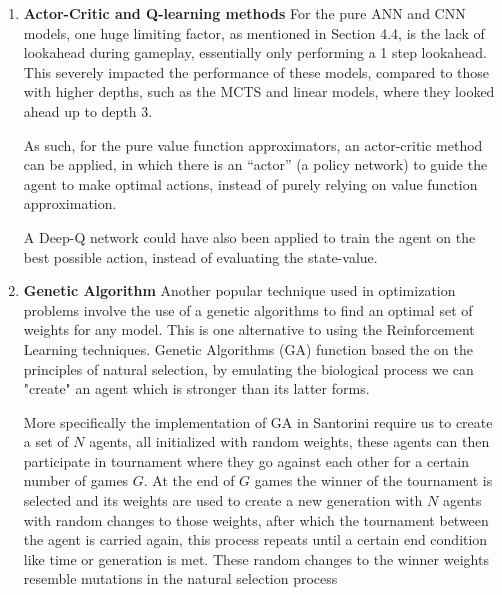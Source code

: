 \documentclass[a4paper,12pt,table]{article}
\begin{document}
\begin{enumerate}
    \item \textbf{Actor-Critic and Q-learning methods}
    \newline
    For the pure ANN and CNN models, one huge limiting factor, as mentioned in Section 4.4, is the lack of lookahead during gameplay, essentially only performing a 1 step lookahead. This severely impacted the performance of these models, compared to those with higher depths, such as the MCTS and linear models, where they looked ahead up to depth 3. \par

    As such, for the pure value function approximators, an actor-critic method can be applied, in which there is an “actor” (a policy network) to guide the agent to make optimal actions, instead of purely relying on value function approximation. \par

    A Deep-Q network could have also been applied to train the agent on the best possible action, instead of evaluating the state-value. \par

    \item \textbf{Genetic Algorithm}
    \newline
    Another popular technique used in optimization problems involve the use of a genetic algorithms to find an optimal set of weights for any model. This is one alternative to using the Reinforcement Learning techniques. Genetic Algorithms (GA) function based the on the principles of natural selection, by emulating the biological process we can "create" an agent which is stronger than its latter forms. \cite{Genetic algorithms: Concepts and Applications} \par

    More specifically the implementation of GA in Santorini require us to create a set of $N$ agents, all initialized with random weights, these agents can then participate in tournament where they go against each other for a certain number of games $G$. At the end of $G$ games the winner of the tournament is selected and its weights are used to create a new generation with $N$ agents with random changes to those weights, after which the tournament between the agent is carried again, this process repeats until a certain end condition like time or generation is met. These random changes to the winner weights resemble mutations in the natural selection process


\end{enumerate}
    
\end{document}
